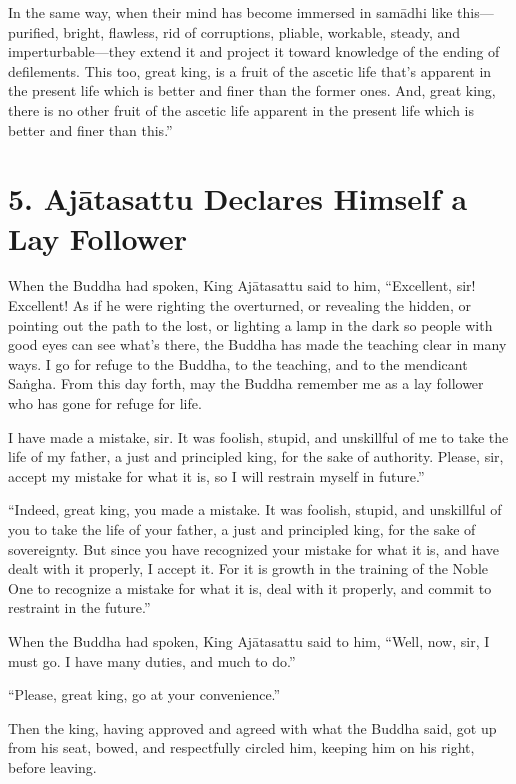 \documentclass[12pt,openany]{book}%
\begin{document}
In the same way, when their mind has become immersed in \textsanskrit{samādhi} like this—purified, bright, flawless, rid of corruptions, pliable, workable, steady, and imperturbable—they extend it and project it toward knowledge of the ending of defilements. This too, great king, is a fruit of the ascetic life that’s apparent in the present life which is better and finer than the former ones. And, great king, there is no other fruit of the ascetic life apparent in the present life which is better and finer than this.” 

\section*{5. \textsanskrit{Ajātasattu} Declares Himself a Lay Follower }

When the Buddha had spoken, King \textsanskrit{Ajātasattu} said to him, “Excellent, sir! Excellent! As if he were righting the overturned, or revealing the hidden, or pointing out the path to the lost, or lighting a lamp in the dark so people with good eyes can see what’s there, the Buddha has made the teaching clear in many ways. I go for refuge to the Buddha, to the teaching, and to the mendicant \textsanskrit{Saṅgha}. From this day forth, may the Buddha remember me as a lay follower who has gone for refuge for life. 

I have made a mistake, sir. It was foolish, stupid, and unskillful of me to take the life of my father, a just and principled king, for the sake of authority. Please, sir, accept my mistake for what it is, so I will restrain myself in future.” 

“Indeed, great king, you made a mistake. It was foolish, stupid, and unskillful of you to take the life of your father, a just and principled king, for the sake of sovereignty. But since you have recognized your mistake for what it is, and have dealt with it properly, I accept it. For it is growth in the training of the Noble One to recognize a mistake for what it is, deal with it properly, and commit to restraint in the future.” 

When the Buddha had spoken, King \textsanskrit{Ajātasattu} said to him, “Well, now, sir, I must go. I have many duties, and much to do.” 

“Please, great king, go at your convenience.” 

Then the king, having approved and agreed with what the Buddha said, got up from his seat, bowed, and respectfully circled him, keeping him on his right, before leaving. 
\end{document}
